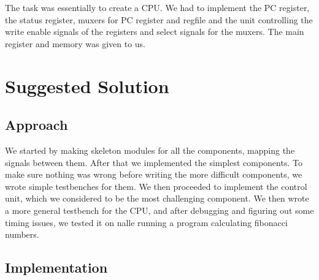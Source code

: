\documentclass[10pt]{report}
\begin{document}
The task was essentially to create a CPU. We had to implement the PC
register, the status register, muxers for PC register and regfile and
the unit controlling the write enable signals of the registers and
select signals for the muxers.  The main register and memory was given
to us.

\section*{Suggested Solution}


\subsection*{Approach}

We started by making skeleton modules for all the components, mapping
the signals between them. After that we implemented the simplest
components.  To make sure nothing was wrong before writing the more
difficult components, we wrote simple testbenches for them. We then
proceeded to implement the control unit, which we considered to be the
most challenging component. We then wrote a more general testbench for
the CPU, and after debugging and figuring out some timing issues, we
tested it on nalle running a program calculating fibonacci numbers.

\subsection*{Implementation}
\end{document}
